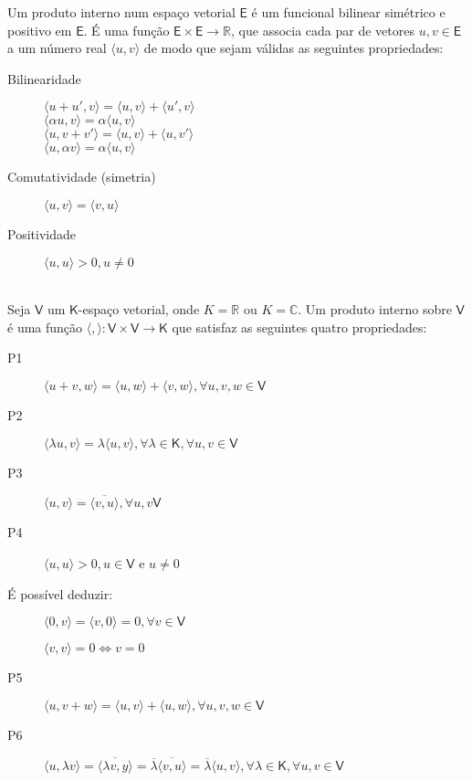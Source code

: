 \documentclass[10pt,a4paper]{article}
\begin{document}
\begin{definition}
	Um produto interno num espaço vetorial $\textsf{E}$ é um funcional bilinear simétrico e positivo em $\textsf{E}$. É uma função $\textsf{E}\times\textsf{E} \rightarrow \mathbb{R}$, que associa cada par de vetores $u, v \in \textsf{E}$ a um número real $\langle u, v\rangle$ de modo que sejam válidas as seguintes propriedades:
	\begin{description}
		\item [Bilinearidade] 
				\tabto{2cm} $\langle u + u', v\rangle = \langle u, v\rangle + \langle u', v\rangle$ \\
				\tabto{2cm} $\langle \alpha u, v\rangle = \alpha\langle u, v\rangle$ \\
				\tabto{2cm} $\langle u, v + v'\rangle = \langle u, v\rangle + \langle u, v'\rangle$ \\
				\tabto{2cm} $\langle u, \alpha v\rangle = \alpha\langle u, v\rangle$ \\
		\item [Comutatividade (simetria)]
				\tabto{2cm} $\langle u, v\rangle = \langle v, u\rangle$ 
		\item [Positividade]
				\tabto{2cm} $\langle u, u\rangle > 0, u \neq 0$ 
	\end{description}
	~\\
	 Seja $\mathsf{V}$ um $\mathsf{K}$-espaço vetorial, onde $K = \mathbb{R}$ ou $K = \mathbb{C}$. Um produto interno sobre $\mathsf{V}$ é uma função $\langle, \rangle : \mathsf{V} \times \mathsf{V} \rightarrow \mathsf{K}$ que satisfaz as seguintes quatro propriedades:
	\begin{description}
		\item [P1] $\langle u + v, w\rangle = \langle u, w\rangle + \langle v, w\rangle, \forall u, v, w \in \mathsf{V}$ 
		\item [P2] $\langle \lambda u, v\rangle = \lambda\langle u, v\rangle, \forall \lambda \in \mathsf{K},  \forall u, v \in \mathsf{V}$ 
		\item [P3] $\langle u, v\rangle = \overline{\langle v, u\rangle}, \forall u, v \mathsf{V}$ 
		\item [P4] $\langle u, u\rangle > 0, u \in \mathsf{V}$ e $u \neq 0$ 
	\end{description}
\end{definition}
 É possível deduzir:
	\begin{description}
		\item [] $\langle 0, v\rangle = \langle v, 0\rangle = 0, \forall v \in \mathsf{V}$ 
		\item [] $\langle v, v\rangle = 0 \Leftrightarrow v = 0$ 
		\item [P5] $\langle u, v + w\rangle = \langle u, v\rangle + \langle u, w\rangle, \forall u, v, w \in \mathsf{V}$
		\item [P6] $\langle u, \lambda v \rangle = \overline{\langle \lambda v, y\rangle} = \overline{\lambda} \overline{ \langle v, u\rangle} = \overline{\lambda} \langle u, v \rangle , \forall \lambda \in \mathsf{K},  \forall u, v \in \mathsf{V}$ 
	\end{description}
	
\end{document}
